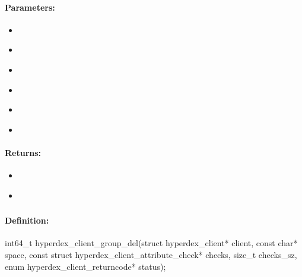 \paragraph{Parameters:}
\begin{itemize}[noitemsep]
\item {}\\

\item {}\\

\item {}\\

\item {}\\

\item {}\\

\item {}\\

\end{itemize}

\paragraph{Returns:}
\begin{itemize}[noitemsep]
\item {}\\

\item {}\\

\end{itemize}

\pagebreak
\subsubsection{}
\label{api:c:group_del}


\paragraph{Definition:}
\begin{ccode}
int64_t hyperdex_client_group_del(struct hyperdex_client* client,
        const char* space,
        const struct hyperdex_client_attribute_check* checks, size_t checks_sz,
        enum hyperdex_client_returncode* status);
\end{ccode}

